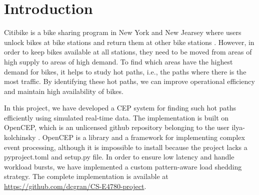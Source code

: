 \documentclass[sigconf]{acmart}
\begin{document}



\maketitle

\section{Introduction}

Citibike is a bike sharing program in New York and New Jearsey where users unlock bikes at bike stations and return them at other bike stations \cite{CitiBikeHowItWorks}. However, in order to keep bikes available at all stations, they need to be moved from areas of high supply to areas of high demand. To find which areas have the highest demand for bikes, it helps to study hot paths, i.e., the paths where there is the most traffic. By identifying these hot paths, we can improve operational efficiency and maintain high availability of bikes.

In this project, we have developed a CEP system for finding such hot paths efficiently using simulated real-time data. The implementation is built on OpenCEP, which is an unlicensed github repository belonging to the user ilya-kolchinsky \cite{OpenCEP}. OpenCEP is a library and a framework for implementing complex event processing, although it is impossible to install because the project lacks a pyproject.toml and setup.py file. In order to ensure low latency and handle workload bursts, we have implemented a custom pattern-aware load shedding strategy. The complete implementation is available at \url{https://github.com/dcgran/CS-E4780-project}.
\end{document}
